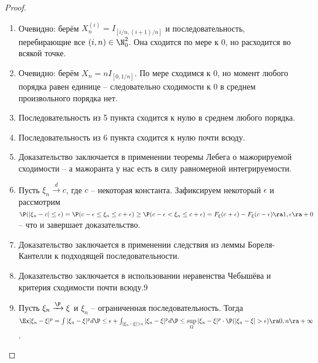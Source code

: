 \begin{proof}
\begin{enumerate}
        \item Очевидно: берём $X^{(i)}_{n} = I_{[i/n, (i + 1)/n]}$ и последовательность, перебирающие все $(i, n) \in \N_0^2$. Она сходится по мере к 0, но расходится во всякой точке.
        \item Очевидно: берём $X_n = nI_{[0, 1/n]}$. По мере сходимся к 0, но момент любого порядка равен единице -- следовательно сходимости к 0 в среднем произвольного порядка нет.
        \item Последовательность из 5 пункта сходится к нулю в среднем любого порядка.
        \item Последовательность из 6 пункта сходится к нулю почти всюду.
        \item Доказательство заключается в применении теоремы Лебега о мажорируемой сходимости -- а мажоранта у нас есть в силу равномерной интегрируемости.
        \item Пусть $\xi_n \xrightarrow{d} c$, где $c$ -- некоторая константа. Зафиксируем некоторый $\epsilon$ и рассмотрим $\P(|\xi_n - c| \leq \epsilon) = \P(c - \epsilon \leq \xi_n \leq c + \epsilon) \geq \P(c - \epsilon < \xi_n \leq c + \epsilon) = F_{\xi}(c + \epsilon) - F_{\xi}(c - \epsilon) \ra 1, \epsilon \ra +0$ -- что и завершает доказательство.
        \item Доказательство заключается в применении следствия из леммы Бореля-Кантелли к подходящей последовательности.
        \item Доказательство заключается в использовании неравенства Чебышёва и критерия сходимости почти всюду.9
        \item Пусть $\xi_n \xrightarrow{\P} \xi$ и $\xi_n$ -- ограниченная последовательность. Тогда $\Ex |\xi_n - \xi|^p = \int |\xi_n - \xi|^p d\P \leq \epsilon + \int_{|\xi_n - \xi| > \epsilon} |\xi_n - \xi|^p d\P \leq \sup\limits_{\Omega} |\xi_n - \xi|^p \cdot \P(|\xi_n - \xi| > \epsilon) \ra 0, n \ra +\infty$.
    \end{enumerate}
\end{proof}
